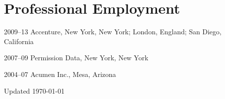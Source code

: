 \documentclass[11pt,letterpaper]{report}
\begin{document}
    \section*{Professional Employment}

    \begin{tablist}

        \item[2009--13] \tab{}Accenture, New York, New York; London, England; San Diego, California
        \item[2007--09] \tab{}Permission Data, New York, New York
        \item[2004--07] \tab{}Acumen Inc., Mesa, Arizona

    \end{tablist}



    \begin{center}
        \vfill
        Updated \monthyeardate\today
    \end{center}
\end{document}
